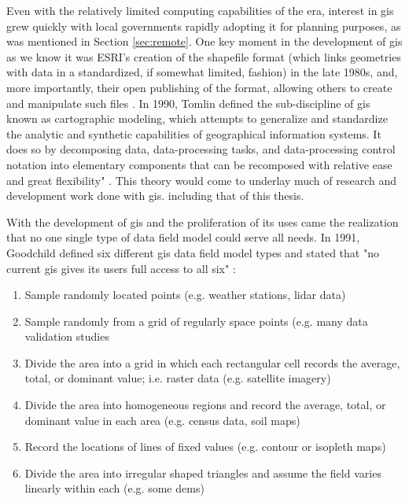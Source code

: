 Even with the relatively limited computing capabilities of the era, interest in \ac{gis} grew quickly with local governments rapidly adopting it for planning purposes, as was mentioned in Section \ref{sec:remote}. One key moment in the development of \ac{gis} as we know it was ESRI's creation of the shapefile format (which links geometries with data in a standardized, if somewhat limited, fashion) in the late 1980s, and, more importantly, their open publishing of the format, allowing others to create and manipulate such files \cite{goodchildModelingEarth2011}. In 1990, Tomlin defined the sub-discipline of \ac{gis} known as cartographic modeling, which attempts to generalize and standardize the analytic and synthetic capabilities of geographical information systems. It does so by decomposing data, data-processing tasks, and data-processing control notation into elementary components that can be recomposed with relative ease and great flexibility" \cite{tomlinGISCartographicModeling2012}. This theory would come to underlay much of research and development work done with \ac{gis}. including that of this thesis. 

With the development of \ac{gis} and the proliferation of its uses came the realization that no one single type of data field model could serve all needs. In 1991, Goodchild defined six different \ac{gis} data field model types and stated that "no current \ac{gis} gives its users full access to all six" \cite{maguireGeographicalInformationSystems1991}:

\begin{enumerate}
    \setlength{\itemsep}{0pt}%
    \setlength{\parskip}{0pt}%
	\item{Sample randomly located points (e.g. weather stations, \ac{lidar} data)}
	\item{Sample randomly from a grid of regularly space points (e.g. many data validation studies}
	\item{Divide the area into a grid in which each rectangular cell records the average, total, or dominant value; i.e. raster data (e.g. satellite imagery)}
	\item{Divide the area into homogeneous regions and record the average, total, or dominant value in each area (e.g. census data, soil maps)}
	\item{Record the locations of lines of fixed values (e.g. contour or isopleth maps)}
	\item{Divide the area into irregular shaped triangles and assume the field varies linearly within each (e.g. some \acp{dem})}
\end{enumerate}


